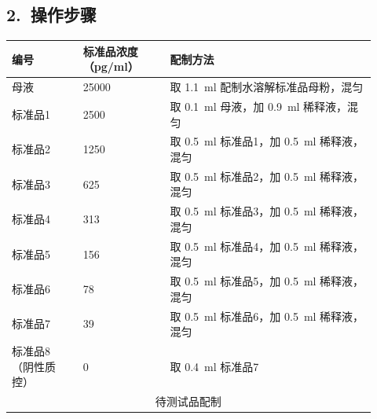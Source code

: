 \documentclass[UTF8,10pt,a4paper,fontset=fandol]{ctexart}
\newcommand{\fieldvalue}[1]{#1}
\newcommand{\handwritten}[1]{#1}
\begin{document}
\subsection*{2.\ 操作步骤}

\begin{tabular}{|p{0.18\linewidth}|p{0.22\linewidth}|p{0.52\linewidth}|}
\hline
编号 & 标准品浓度（pg/ml） & 配制方法
\\ \hline
母液 & 25000 &
取
\fieldvalue{\handwritten{1.1}}
\,ml 配制水溶解标准品母粉，混匀
\\ \hline
标准品1 & 2500 &
取
\fieldvalue{\handwritten{0.1}}
\,ml 母液，加
\fieldvalue{\handwritten{0.9}}
\,ml 稀释液，混匀
\\ \hline
标准品2 & 1250 &
取
\fieldvalue{\handwritten{0.5}}
\,ml 标准品1，加
\fieldvalue{\handwritten{0.5}}
\,ml 稀释液，混匀
\\ \hline
标准品3 & 625 &
取
\fieldvalue{\handwritten{0.5}}
\,ml 标准品2，加
\fieldvalue{\handwritten{0.5}}
\,ml 稀释液，混匀
\\ \hline
标准品4 & 313 &
取
\fieldvalue{\handwritten{0.5}}
\,ml 标准品3，加
\fieldvalue{\handwritten{0.5}}
\,ml 稀释液，混匀
\\ \hline
标准品5 & 156 &
取
\fieldvalue{\handwritten{0.5}}
\,ml 标准品4，加
\fieldvalue{\handwritten{0.5}}
\,ml 稀释液，混匀
\\ \hline
标准品6 & 78 &
取
\fieldvalue{\handwritten{0.5}}
\,ml 标准品5，加
\fieldvalue{\handwritten{0.5}}
\,ml 稀释液，混匀
\\ \hline
标准品7 & 39 &
取
\fieldvalue{\handwritten{0.5}}
\,ml 标准品6，加
\fieldvalue{\handwritten{0.5}}
\,ml 稀释液，混匀
\\ \hline
标准品8（阴性质控） & 0 &
取
\fieldvalue{\handwritten{0.4}}
\,ml 标准品7
\\ \hline
\multicolumn{3}{|c|}{待测试品配制}
\\ \hline
\end{tabular}
\end{document}

